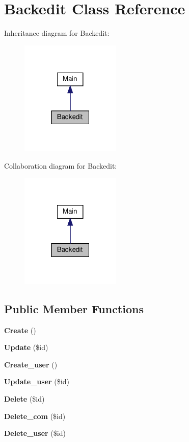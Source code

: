 \section{Backedit Class Reference}
\label{class_src_1_1_controllers_1_1_backedit}


Inheritance diagram for Backedit\+:
\nopagebreak
\begin{figure}[H]
\begin{center}
\leavevmode
\includegraphics[width=135pt]{class_src_1_1_controllers_1_1_backedit__inherit__graph}
\end{center}
\end{figure}


Collaboration diagram for Backedit\+:
\nopagebreak
\begin{figure}[H]
\begin{center}
\leavevmode
\includegraphics[width=135pt]{class_src_1_1_controllers_1_1_backedit__coll__graph}
\end{center}
\end{figure}
\subsection*{Public Member Functions}
\begin{DoxyCompactItemize}
\item 
\textbf{ Create} ()
\item 
\textbf{ Update} (\$id)
\item 
\textbf{ Create\+\_\+user} ()
\item 
\textbf{ Update\+\_\+user} (\$id)
\item 
\textbf{ Delete} (\$id)
\item 
\textbf{ Delete\+\_\+com} (\$id)
\item 
\textbf{ Delete\+\_\+user} (\$id)
\end{DoxyCompactItemize}
